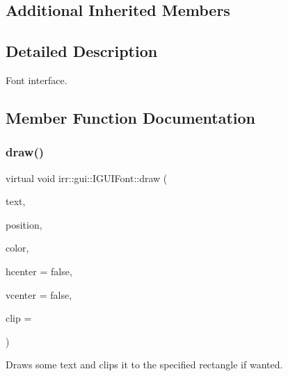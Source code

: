 \subsection*{Additional Inherited Members}


\subsection{Detailed Description}
Font interface. 

\subsection{Member Function Documentation}
\mbox{\label{classirr_1_1gui_1_1IGUIFont_af5627e546c474f31260fe671c24f9a33}} 
\subsubsection{\texorpdfstring{draw()}{draw()}}
{\footnotesize\ttfamily virtual void irr\+::gui\+::\+I\+G\+U\+I\+Font\+::draw (\begin{DoxyParamCaption}\item[{const \hyperlink{namespaceirr_1_1core_aef83fafbb1b36fcce44c07c9be23a7f2}{core\+::stringw} \&}]{text,  }\item[{const \hyperlink{classirr_1_1core_1_1rect}{core\+::rect}$<$ \hyperlink{namespaceirr_ac66849b7a6ed16e30ebede579f9b47c6}{s32} $>$ \&}]{position,  }\item[{\hyperlink{classirr_1_1video_1_1SColor}{video\+::\+S\+Color}}]{color,  }\item[{bool}]{hcenter = {\ttfamily false},  }\item[{bool}]{vcenter = {\ttfamily false},  }\item[{const \hyperlink{classirr_1_1core_1_1rect}{core\+::rect}$<$ \hyperlink{namespaceirr_ac66849b7a6ed16e30ebede579f9b47c6}{s32} $>$ $\ast$}]{clip = {} }\end{DoxyParamCaption})\hspace{0.3cm}{\ttfamily [pure virtual]}}



Draws some text and clips it to the specified rectangle if wanted. 


